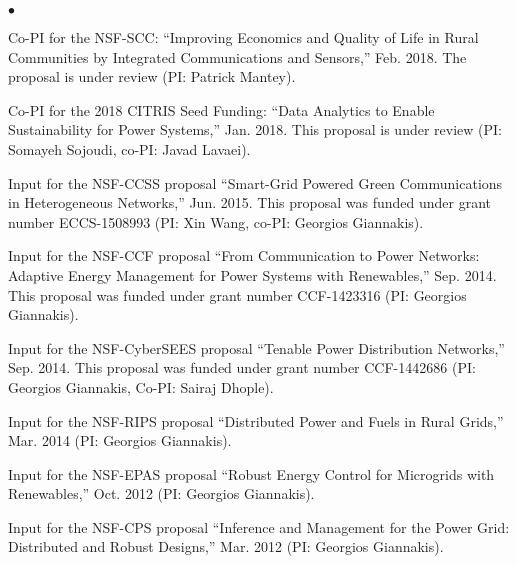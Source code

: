 \documentclass[margin,line]{res}
\newenvironment{list2}{
  \begin{list}{$\bullet$}{%
      \setlength{\itemsep}{0in}
      \setlength{\parsep}{0in} \setlength{\parskip}{0in}
      \setlength{\topsep}{0in} \setlength{\partopsep}{0in}
      \setlength{\leftmargin}{0.10in}}}{\end{list}}
\begin{document}
\begin{resume}
\begin{list2}
\item   Co-PI for the NSF-SCC: ``Improving Economics and Quality of Life in Rural Communities by Integrated Communications and Sensors,'' 
Feb. 2018. The proposal is under review (PI: Patrick Mantey).


\item   Co-PI for the 2018 CITRIS Seed Funding: ``Data Analytics to Enable Sustainability for Power Systems,'' Jan. 2018. This proposal is under review (PI: Somayeh Sojoudi, co-PI: Javad Lavaei).

\item   Input for the NSF-CCSS proposal ``Smart-Grid Powered Green Communications
        in Heterogeneous Networks,'' Jun. 2015.
        This proposal was funded under grant number ECCS-1508993 (PI: Xin Wang, co-PI: Georgios Giannakis).

\item   Input for the NSF-CCF proposal ``From Communication to Power Networks:
        Adaptive Energy Management for Power Systems with Renewables,'' Sep. 2014.
        This proposal was funded under grant number CCF-1423316 (PI: Georgios Giannakis).

\item   Input for the NSF-CyberSEES proposal ``Tenable Power Distribution Networks,'' Sep. 2014.
        This proposal was funded under grant number CCF-1442686 (PI: Georgios Giannakis, Co-PI: Sairaj Dhople).

\item   Input for the NSF-RIPS proposal ``Distributed Power and Fuels in Rural Grids,''
        Mar. 2014 (PI: Georgios Giannakis).

\item   Input for the NSF-EPAS proposal ``Robust Energy Control for Microgrids with Renewables,''
        Oct. 2012 (PI: Georgios Giannakis).

\item   Input for the NSF-CPS proposal ``Inference and Management for the Power Grid: Distributed and Robust Designs,''
        Mar. 2012 (PI: Georgios Giannakis).
\end{list2}

\vspace{.3cm}




\end{resume}
\end{document}
